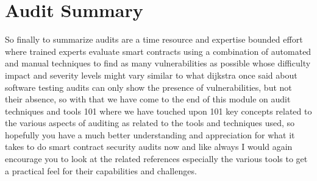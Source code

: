 \section{Audit Summary}

So finally to summarize audits are a time resource and expertise bounded effort where trained experts evaluate smart contracts using a combination of automated and manual techniques to find as many vulnerabilities as possible whose difficulty impact and severity levels might vary similar to what dijkstra once said about software testing audits can only show the presence of vulnerabilities, but not their absence, so with that we have come to the end of this module on audit techniques and tools 101 where we have touched upon 101 key concepts related to the various aspects of auditing as related to the tools and techniques used, so hopefully you have a much better understanding and appreciation for what it takes to do smart contract security audits now and like always I would again encourage you to look at the related references especially the various tools to get a practical feel for their capabilities and challenges.
